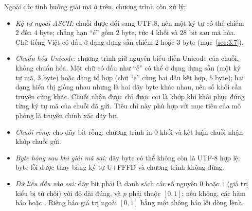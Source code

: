 Ngoài các tình huống giải mã ở trên, chương trình còn xử lý:
\begin{itemize}
  \item \emph{Ký tự ngoài ASCII:} chuỗi được đổi sang UTF-8, nên một ký tự có
        thể chiếm $2$ đến $4$ byte; chẳng hạn ``é'' gồm $2$ byte, tức $4$ khối
        và $28$ bit sau mã hóa. Chữ tiếng Việt có dấu ở dạng dựng sẵn chiếm $2$
        hoặc $3$ byte (mục~\ref{sec:3.7}).
  \item \emph{Chuẩn hóa Unicode:} chương trình giữ nguyên biểu diễn Unicode của
        chuỗi, không chuẩn hóa. Một chữ có dấu như ``ế'' có thể ở dạng dựng sẵn
        (một ký tự mã, $3$ byte) hoặc dạng tổ hợp (chữ ``e'' cùng hai dấu kết
        hợp, $5$ byte); hai dạng hiển thị giống nhau nhưng là hai dãy byte khác
        nhau, nên số khối cần truyền cũng khác. Chuỗi nhận được chỉ được coi là
        khớp khi khôi phục đúng từng ký tự mã của chuỗi đã gửi. Tiêu chí này phù
        hợp với mục tiêu của mô phỏng là truyền chính xác dãy bit.
  \item \emph{Chuỗi rỗng:} cho dãy bit rỗng; chương trình in $0$ khối và kết
        luận chuỗi nhận khớp chuỗi gửi.
  \item \emph{Byte hỏng sau khi giải mã sai:} dãy byte có thể không còn là
        UTF-8 hợp lệ; byte lỗi được thay bằng ký tự U+FFFD và chương trình
        không dừng.
  \item \emph{Dữ liệu đầu vào sai:} dãy bit phải là danh sách các số nguyên $0$
        hoặc $1$ (giá trị kiểu  bị từ chối) với độ dài đúng, và $p$
        phải thuộc $[0,1]$; nếu không, các hàm báo  hoặc
        . Riêng  báo giá trị  ngoài
        $[0,1]$ bằng một thông báo lỗi dòng lệnh.
\end{itemize}
\endgroup
